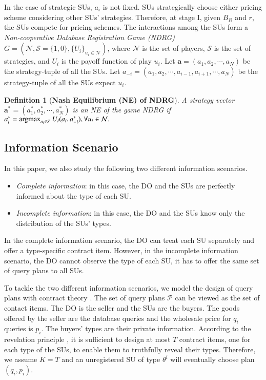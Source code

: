 \documentclass[journal]{IEEEtran}
\newtheorem{definition}{Definition}
\newcommand{\argmax}{\operatornamewithlimits{argmax}}
\begin{document}
In the case of strategic SUs, $a_i$ is not fixed. SUs strategically choose either pricing scheme considering other SUs' strategies.
Therefore, at stage I, given $B_R$ and $r$, the SUs compete for pricing schemes. The interactions among the SUs form a \emph{Non-cooperative Database Registration Game (NDRG)} $G=(\mathcal{N}, \mathcal{S}=\{1,0\}, \{U_i\}_{u_i\in \mathcal{N}})$, where $\mathcal{N}$ is the set of players, $\mathcal{S}$ is the set of strategies, and $U_i$ is the payoff function of play $u_i$. Let $\mathbf{a}=(a_1, a_2, \cdots, a_N)$ be the strategy-tuple of all the SUs. Let $a_{-i}=(a_1, a_2, \cdots, a_{i-1}, a_{i+1}, \cdots, a_N)$ be the strategy-tuple of all the SUs expect $u_i$.
\begin{definition}[\textbf{Nash Equilibrium (NE) of NDRG}]
A strategy vector $\mathbf{a^*}=(a_1^*, a_2^*, \cdots, a_N^*)$ is an NE of the game NDRG if
$
a_i^*=\argmax_{a_i\in S}U_i(a_i, a_{-i}^*), \forall u_i \in\mathcal{N}.
$
\end{definition}

\subsection{Information Scenario}

In this paper, we also study the following two different information scenarios.
\begin{itemize}
  \item \emph{Complete information}: in this case, the DO and the SUs are perfectly informed about the type of each SU.
  \item \emph{Incomplete information}: in this case, the DO and the SUs know only the distribution of the SUs' types.
\end{itemize}

In the complete information scenario, the DO can treat each SU separately and offer a type-specific contract item. However, in the incomplete information scenario, the DO cannot observe the type of each SU, it has to offer the same set of query plans to all SUs.

To tackle the two different information scenarios, we model the design of query plans with contract theory \cite{contract_book}. The set of query plans $\mathcal{P}$ can be viewed as the set of contact items. The DO is the seller and the SUs are the buyers. The goods offered by the seller are the database queries and the wholesale price for $q_i$ queries is $p_i$. The buyers' types are their private information. According to the revelation principle \cite{contract_book}\cite{revelation}, it is sufficient to design at most $T$ contract items, one for each type of the SUs, to enable them to truthfully reveal their types. Therefore, we assume $K=T$ and an unregistered SU of type $\theta^i$ will eventually choose plan $(q_i, p_i)$.
\end{document}
